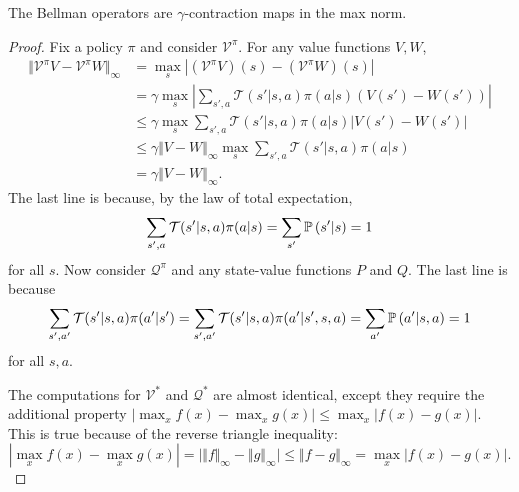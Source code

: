 \documentclass[twoside,10pt]{report}
\begin{document}
\begin{prop}
The Bellman operators are $\gamma$-contraction maps in the max norm.
\end{prop}
\begin{proof}
Fix a policy $\pi$ and consider $\mathcal{V}^{\pi}$. For any value functions $V, W$,
        \begin{align*}
                {\Vert{\mathcal{V}^{\pi} V - \mathcal{V}^{\pi} W}\Vert}_{\infty} &= \max_{s} \left| (\mathcal{V}^{\pi} V)(s) - (\mathcal{V}^{\pi} W)(s) \right| \\                                                       &= \gamma \max_{s} \left| \sum_{s',a} \mathcal{T}(s'|s,a) \pi(a|s) \left( V(s') - W(s') \right) \right| \\                                                       &\leq \gamma \max_{s} \sum_{s',a} \mathcal{T}(s'|s,a) \pi(a|s) \left| V(s') - W(s') \right| \\                                                       &\leq \gamma {\Vert{V-W}\Vert}_{\infty} \max_{s} \sum_{s',a} \mathcal{T}(s'|s,a) \pi(a|s) \\                                                       &= \gamma {\Vert{V-W}\Vert}_{\infty}.
        \end{align*}
        The last line is because, by the law of total expectation,
	\[
		\sum_{s',a} \mathcal{T}(s'|s,a) \pi(a|s) = \sum_{s'} \P{ s' | s } = 1
	\]
	for all $s$. Now consider $\mathcal{Q}^{\pi}$ and any state-value functions $P$ and $Q$.
	The last line is because
	\[
		\sum_{s',a'} \mathcal{T}(s'|s,a) \pi(a'|s') = \sum_{s',a'} \mathcal{T}(s'|s,a)\pi(a'|s',s,a) = \sum_{a'} \P{a'|s,a } = 1
	\]
	for all $s,a$.

	The computations for $\mathcal{V}^{*}$ and $\mathcal{Q}^{*}$ are almost identical, except they require the additional property $\left| \max_{x} f(x) - \max_{x} g(x) \right| \leq \max_x \left| f(x) - g(x) \right|$. This is true because of the reverse triangle inequality:
	\[
	\left| \max_{x}f(x) - \max_{x}g(x) \right| = \Big| {\Vert{f}\Vert}_{\infty} - {\Vert{g}\Vert}_{\infty} \Big| \leq {\Vert{f-g}\Vert}_{\infty} = \max_{x} \left| f(x) - g(x) \right|.
	\]
\end{proof}
\end{document}
